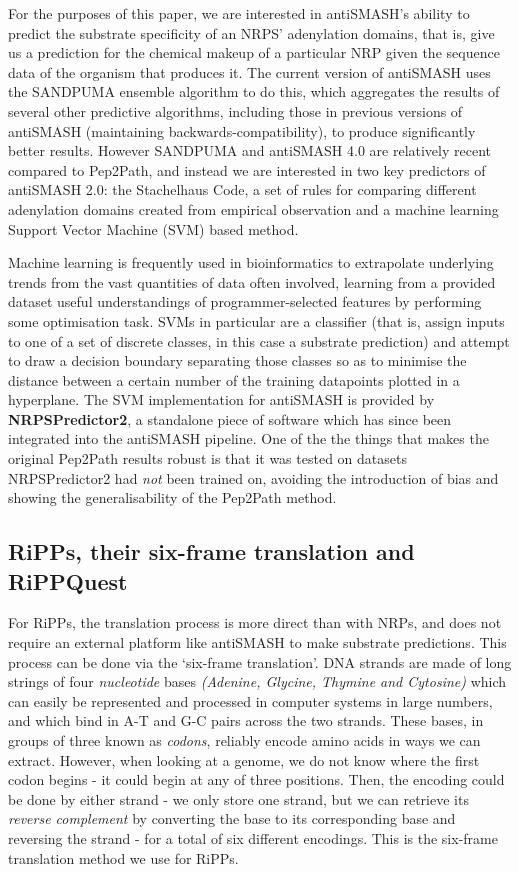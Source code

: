 \documentclass{l4proj}
\newcommand{\cit}[1]{\citep{#1}}
\begin{document}
For the purposes of this paper, we are interested in antiSMASH's ability to predict the substrate specificity of an NRPS' adenylation domains, that is, give us a prediction for the chemical makeup of a particular NRP given the sequence data of the organism that produces it. The current version of antiSMASH uses the SANDPUMA ensemble algorithm to do this, which aggregates the results of several other predictive algorithms, including those in previous versions of antiSMASH (maintaining backwards-compatibility), to produce significantly better results. However SANDPUMA and antiSMASH 4.0 are relatively recent compared to Pep2Path, and instead we are interested in two key predictors of antiSMASH 2.0: the Stachelhaus Code, a set of rules for comparing different adenylation domains created from empirical observation \cit{stachelhaus} and a machine learning Support Vector Machine (SVM) based method.

Machine learning is frequently used in bioinformatics to extrapolate underlying trends from the vast quantities of data often involved, learning from a provided dataset useful understandings of programmer-selected features by performing some optimisation task. SVMs in particular are a classifier (that is, assign inputs to one of a set of discrete classes, in this case a substrate prediction) and attempt to draw a decision boundary separating those classes so as to minimise the distance between a certain number of the training datapoints plotted in a hyperplane. The SVM implementation for antiSMASH is provided by \textbf{NRPSPredictor2}, \cit{nrps2} a standalone piece of software which has since been integrated into the antiSMASH pipeline. One of the the things that makes the original Pep2Path results robust is that it was tested on datasets NRPSPredictor2 had \textit{not} been trained on, avoiding the introduction of bias and showing the generalisability of the Pep2Path method.

\subsection{RiPPs, their six-frame translation and RiPPQuest} \label{ripps}

For RiPPs, the translation process is more direct than with NRPs, and does not require an external platform like antiSMASH to make substrate predictions. This process can be done via the `six-frame translation'. DNA strands are made of long strings of four \textit{nucleotide} bases \textit{(Adenine, Glycine, Thymine and Cytosine)} which can easily be represented and processed in computer systems in large numbers, and which bind in A-T and G-C pairs across the two strands. These bases, in groups of three known as \textit{codons}, reliably encode amino acids in ways we can extract. However, when looking at a genome, we do not know where the first codon begins - it could begin at any of three positions. Then, the encoding could be done by either strand - we only store one strand, but we can retrieve its \textit{reverse complement} by converting the base to its corresponding base and reversing the strand - for a total of six different encodings. This is the six-frame translation method we use for RiPPs.
\end{document}
